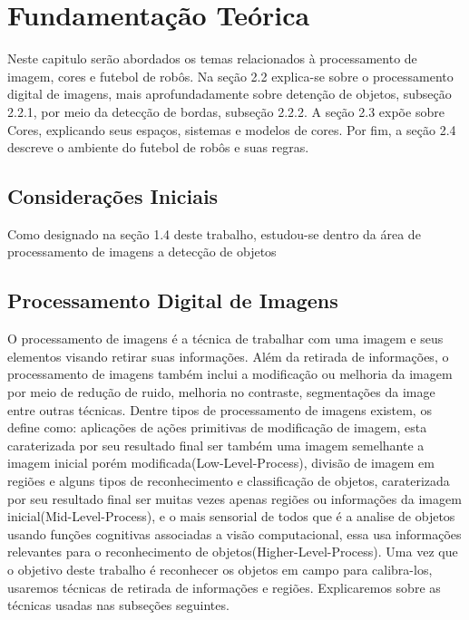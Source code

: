 \graphicspath{{figuras/}}
\chapter{Fundamentação Teórica} \label{Cap:Fundamentacao}
Neste capitulo serão abordados os temas relacionados à processamento de imagem, cores e futebol de robôs. Na seção 2.2 explica-se sobre o processamento digital de imagens, mais aprofundadamente sobre detenção de objetos, subseção 2.2.1, por meio da detecção de bordas, subseção 2.2.2.  A seção 2.3 expõe sobre Cores, explicando seus espaços, sistemas e modelos de cores. Por fim, a seção 2.4 descreve o ambiente do futebol de robôs e suas regras.
\section{Considerações Iniciais}
Como designado na seção 1.4 deste trabalho, estudou-se dentro da área de processamento de imagens a detecção de objetos

\section{Processamento Digital de Imagens}

O processamento de imagens é a técnica de trabalhar com uma imagem e seus elementos visando retirar suas informações\cite{Albuquerque:2001}. Além da retirada de informações, o processamento de imagens também inclui a modificação ou melhoria da imagem por meio de redução de ruido, melhoria no contraste, segmentações da image entre outras técnicas. Dentre tipos de processamento de imagens existem,  os define como: aplicações de ações primitivas de modificação de imagem, esta caraterizada por seu resultado final ser também uma imagem semelhante a imagem inicial porém modificada(Low-Level-Process), divisão de imagem em regiões e alguns tipos de reconhecimento e classificação de objetos, caraterizada por seu resultado final ser muitas vezes apenas regiões ou informações da imagem inicial(Mid-Level-Process), e o mais sensorial de todos que é a analise de objetos usando funções cognitivas associadas a visão computacional, essa usa informações relevantes para o reconhecimento de objetos(Higher-Level-Process). 
Uma vez que o objetivo deste trabalho é reconhecer os objetos em campo para calibra-los, usaremos técnicas de retirada de informações e regiões. Explicaremos sobre as técnicas usadas nas subseções seguintes.


